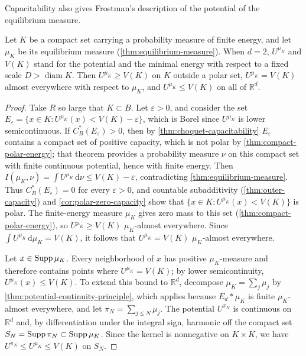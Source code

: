Capacitability also gives Frostman's description of the potential of the equilibrium measure.

\begin{proposition}\label{prop:equilibrium-frostman}
Let $K$ be a compact set carrying a probability measure of finite energy, and let $\mu_K$ be its equilibrium measure (\cref{thm:equilibrium-measure}). When $d=2$, $U^{\mu_K}$ and $V(K)$ stand for the potential and the minimal energy with respect to a fixed scale $D>\operatorname{diam}K$. Then $U^{\mu_K}\geq V(K)$ on $K$ outside a polar set, $U^{\mu_K}=V(K)$ almost everywhere with respect to $\mu_K$, and $U^{\mu_K}\leq V(K)$ on all of $\mathbb R^d$.
\end{proposition}
\begin{proof}
Take $R$ so large that $K\subset B$. Let $\varepsilon>0$, and consider the set $E_\varepsilon=\{x\in K:U^{\mu_K}(x)<V(K)-\varepsilon\}$, which is Borel since $U^{\mu_K}$ is lower semicontinuous. If $C_B^*(E_\varepsilon)>0$, then by \cref{thm:choquet-capacitability} $E_\varepsilon$ contains a compact set of positive capacity, which is not polar by \cref{thm:compact-polar-energy}; that theorem provides a probability measure $\nu$ on this compact set with finite continuous potential, hence with finite energy. Then $I(\mu_K,\nu)=\int U^{\mu_K}\,\mathrm d\nu\leq V(K)-\varepsilon$, contradicting \cref{thm:equilibrium-measure}. Thus $C_B^*(E_\varepsilon)=0$ for every $\varepsilon>0$, and countable subadditivity (\cref{thm:outer-capacity}) and \cref{cor:polar-zero-capacity} show that $\{x\in K:U^{\mu_K}(x)<V(K)\}$ is polar. The finite-energy measure $\mu_K$ gives zero mass to this set (\cref{thm:compact-polar-energy}), so $U^{\mu_K}\geq V(K)$ $\mu_K$-almost everywhere. Since $\int U^{\mu_K}\,\mathrm d\mu_K=V(K)$, it follows that $U^{\mu_K}=V(K)$ $\mu_K$-almost everywhere.

Let $x\in\operatorname{Supp}\mu_K$. Every neighborhood of $x$ has positive $\mu_K$-measure and therefore contains points where $U^{\mu_K}=V(K)$; by lower semicontinuity, $U^{\mu_K}(x)\leq V(K)$. To extend this bound to $\mathbb R^d$, decompose $\mu_K=\sum_j\mu_j$ by \cref{thm:potential-continuity-principle}, which applies because $E_d*\mu_K$ is finite $\mu_K$-almost everywhere, and let $\pi_N=\sum_{j\leq N}\mu_j$. The potential $U^{\pi_N}$ is continuous on $\mathbb R^d$ and, by differentiation under the integral sign, harmonic off the compact set $S_N=\operatorname{Supp}\pi_N\subset\operatorname{Supp}\mu_K$. Since the kernel is nonnegative on $K\times K$, we have $U^{\pi_N}\leq U^{\mu_K}\leq V(K)$ on $S_N$.


\end{proof}
